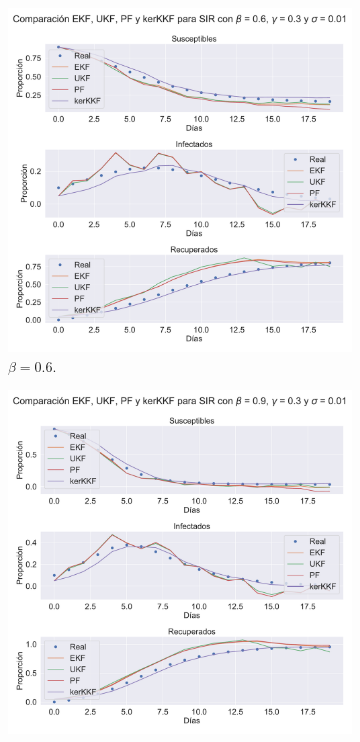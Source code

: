 \begin{figure}[h]
    \centering
    \begin{subfigure}[b]{0.49\textwidth}
        \includegraphics[width=\linewidth]{img/content/chapter4/nonlinear_filters_sir_beta_06.pdf}
    \caption{$\beta = 0.6$.}
    \label{fig:nonlinear_filters_sir_beta_06}
    \end{subfigure}
    \begin{subfigure}[b]{0.49\textwidth}
        \includegraphics[width=\linewidth]{img/content/chapter4/nonlinear_filters_sir_beta_09.pdf}

\end{subfigure}
\end{figure}
